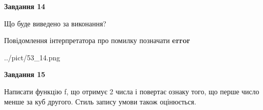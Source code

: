 \documentclass[11pt, ukrainian]{article}
\begin{document}
{\begin {large}
{\begin {center}\textbf{Завдання 14}\end {center}}\par
Що буде виведено за виконання? \par
Повідомлення інтерпретатора про помилку позначати \textbf{error}

\begin{center}
	{../pict/53_14.png}
\end{center}
\newpage

{\begin {center}\textbf{Завдання 15}\end {center}}\par

Написати функцiю f, що отримує 2 числа і повертає ознаку того, що перше число менше за куб другого. Стиль запису умови також оцінюється.\par
\newpage

\end {large}}
\end{document}
